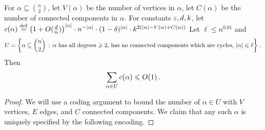 \begin{lemma}
\label{lem:lb-no-cycles}
  For $\alpha \subseteq \binom{n}{2}$, let $V(\alpha)$ be the number of vertices in $\alpha$, let $C(\alpha)$ be the number of connected components in $\alpha$.
  For constants $\varepsilon,d,k$, let $c(\alpha) \stackrel{\mathrm{def}}= \left(1 + O(\tfrac dn)\right)^{|\alpha|} \cdot n^{-|\alpha|} \cdot (1 - \delta)^{|\alpha|} \cdot k^{2(|\alpha| - V(\alpha) + C(\alpha))}$
  Let $\ell \leq n^{0.01}$ and
  \[
  U = \left \{ \alpha \subseteq \binom{n}{2} \, : \, \alpha \text{ has all degrees $\geqslant 2$, has no connected components which are cycles, $|\alpha| \leqslant \ell$} \right \}\,.
  \]
  Then
  \[
  \sum_{\alpha \in U} c(\alpha) \leqslant O(1)\,.
  \]
\end{lemma}
\begin{proof}
  We will use a coding argument to bound the number of $\alpha \in U$ with $V$ vertices, $E$ edges, and $C$ connected components.
  We claim that any such $\alpha$ is uniquely specified by the following encoding.


\end{proof}
